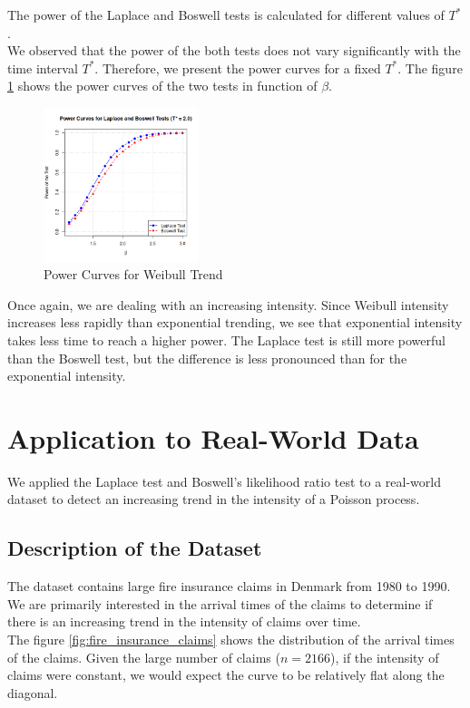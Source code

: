 \documentclass{journalstyle}
\begin{document}
The power of the Laplace and Boswell tests is calculated for different values of $T^*$. \\
We observed that the power of the both tests does not vary significantly with the time interval $T^*$.
Therefore, we present the power curves for a fixed $T^*$.
The figure \ref{fig:power_weibull_beta} shows the power curves of the two tests in function of $\beta$. \\
\begin{figure}[H]
    \centering
    \includegraphics[width=0.4\textwidth]{src/power_weibull.png}
    \caption{Power Curves for Weibull Trend}
    \label{fig:power_weibull_beta}
\end{figure}


Once again, we are dealing with an increasing intensity.
Since Weibull intensity increases less rapidly than exponential trending, we see that exponential intensity takes less time to reach a higher power.
The Laplace test is still more powerful than the Boswell test, but the difference is less pronounced than for the exponential intensity. \\


\section{Application to Real-World Data}

We applied the Laplace test and Boswell's likelihood ratio test to a real-world dataset to detect an increasing trend in the intensity of a Poisson process.

\subsection{Description of the Dataset}

The dataset contains large fire insurance claims in Denmark from 1980 to 1990.
We are primarily interested in the arrival times of the claims to determine if there is an increasing trend in the intensity of claims over time. \\
The figure \ref{fig:fire_insurance_claims} shows the distribution of the arrival times of the claims.
Given the large number of claims ($n = 2166$), if the intensity of claims were constant, we would expect the curve to be relatively flat along the diagonal. \\
\end{document}
